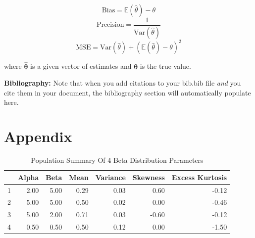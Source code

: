 \documentclass{article}\usepackage[]{graphicx}\usepackage[]{xcolor}
\begin{document}
\begin{multicols}{2}
\[\text{Bias} = \mathbb{E}(\hat{\theta}) - \theta\]
\[\text{Precision} = \frac{1}{\text{Var}(\hat{\theta})}\]
\[\text{MSE} = \text{Var}(\hat{\theta}) + \left( \mathbb{E}(\hat{\theta}) - \theta \right)^2\]

\noindent where $\boldsymbol{\hat{\theta}}$ is a given vector of estimates and $\boldsymbol{\theta}$ is the true value.

\vspace{2em}

\noindent\textbf{Bibliography:} Note that when you add citations to your bib.bib file \emph{and}
you cite them in your document, the bibliography section will automatically populate here.

\begin{tiny}

\end{tiny}
\end{multicols}

\newpage
\onecolumn
\section{Appendix}

\begin{table}[ht]
\centering
\caption{Population Summary Of 4 Beta Distribution Parameters}
\label{table1}
\begin{tabular}{rrrrrrr}
  \hline
 & Alpha & Beta & Mean & Variance & Skewness & Excess Kurtosis \\ 
  \hline
1 & 2.00 & 5.00 & 0.29 & 0.03 & 0.60 & -0.12 \\ 
  2 & 5.00 & 5.00 & 0.50 & 0.02 & 0.00 & -0.46 \\ 
  3 & 5.00 & 2.00 & 0.71 & 0.03 & -0.60 & -0.12 \\ 
  4 & 0.50 & 0.50 & 0.50 & 0.12 & 0.00 & -1.50 \\ 
   \hline
\end{tabular}
\end{table}
\end{document}
